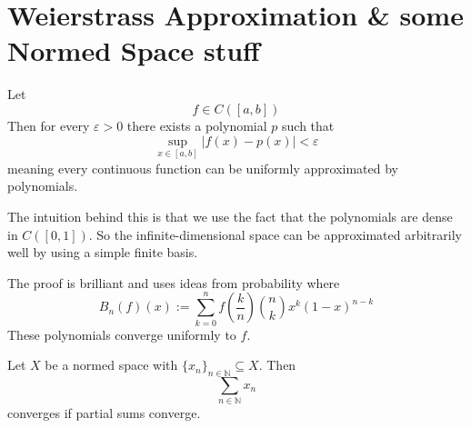 \newpage
\section{Weierstrass Approximation \& some Normed Space stuff}

\begin{thm}
    Let 
    \[
        f \in C([a,b])
    \]
    Then for every $\varepsilon > 0$ there exists a polynomial 
    $p$ such that 
    \[
        \sup_{x\in[a,b]}|f(x)-p(x)| < \varepsilon
    \]
    meaning every continuous function can be uniformly approximated 
    by polynomials.
\end{thm}
The intuition behind this is that we use the fact that 
the polynomials are dense in $C([0,1])$. So the infinite-dimensional 
space can be approximated arbitrarily well by using a simple 
finite basis.

The proof is brilliant and uses ideas from probability where 
\[
    B_n(f)(x) := \displaystyle\sum_{k=0}^{n}f\left(\frac{k}{n}\right)
    \binom{n}{k}x^k(1-x)^{n-k}
\]
These polynomials converge uniformly to $f$.

\begin{thm}
    Let $X$ be a normed space with 
    $\{x_n\}_{n\in\mathbb N} \subseteq  X$. 
    Then 
    \[
        \displaystyle\sum_{n\in\mathbb N} x_n
    \]
    converges if partial sums converge.
\end{thm}

